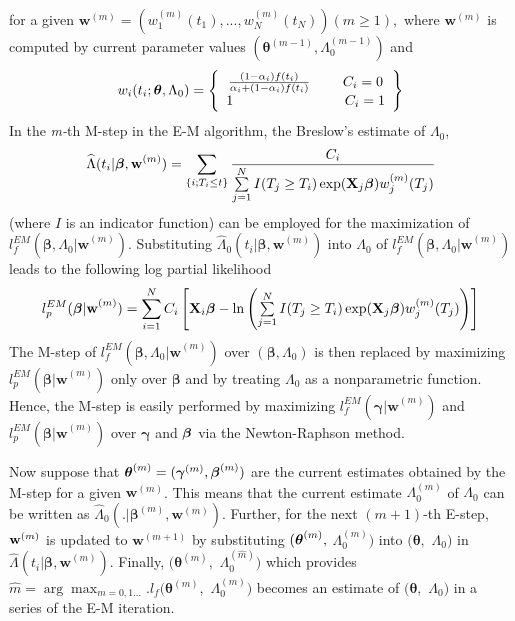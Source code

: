 \documentclass[a4paper, 12pt]{article}
\begin{document}
for a given $\mathbf{w}^{(m)}=(w_{1}^{(m)}(t_{1}),...,w_{N}^{(m)}(t_{N}))(m%
\geq 1),$ where $\mathbf{w}^{(m)}$ is computed by current parameter values $(%
\mathbf{\theta }^{(m-1)},\Lambda _{0}^{(m-1)})$ and%
\begin{equation}
w_{i}(t_{i};\mathbf{\theta },\Lambda _{0})=\left\{ 
\begin{array}{c}
\frac{(1-\alpha _{i})f(t_{i})}{\alpha _{i}+(1-\alpha _{i})f(t_{i})}\text{ \
\ \ \ }C_{i}=0 \\ 
1\text{ \ \ \ \ \ \ \ \ \ \ \ \ \ \ \ \ \ \ \ \ \ }C_{i}=1%
\end{array}%
\right\}
\end{equation}%
In the \textit{m-}th M-step in the E-M algorithm, the Breslow's estimate of $%
\Lambda _{0}$,%
\begin{equation}
\widehat{\Lambda }(t_{i}|\mathbf{\beta ,w}^{(m)})=\displaystyle %
\sum\limits_{\{i;T_{i}\leq t\}}\frac{C_{i}}{\tsum\limits_{j=1}^{N}I(T_{j}%
\geq T_{i})\exp (\mathbf{X}_{j}\mathbf{\beta })w_{j}^{(m)}(T_{j})}
\end{equation}%
(where $I$ is an indicator function) can be employed for the maximization of 
$l_{f}^{EM}(\mathbf{\beta ,}\Lambda _{0}\mathbf{|w}^{(m)})$. Substituting $%
\widehat{\Lambda }_{0}(t_{i}|\mathbf{\beta ,w}^{(m)})$ into $\Lambda _{0}$
of $l_{f}^{EM}(\mathbf{\beta ,}\Lambda _{0}\mathbf{|w}^{(m)})$ leads to the
following log partial likelihood%
\begin{equation}
l_{p}^{EM}(\mathbf{\beta |w}^{(m)})=\sum\limits_{i=1}^{N}C_{i}\left[ \mathbf{%
X}_{i}\mathbf{\beta }-\ln \left( \tsum\limits_{j=1}^{N}I(T_{j}\geq
T_{i})\exp (\mathbf{X}_{j}\mathbf{\beta })w_{j}^{(m)}(T_{j})\right) \right]
\end{equation}%
The M-step of $l_{f}^{EM}(\mathbf{\beta ,}\Lambda _{0}\mathbf{|w}^{(m)})$
over $(\mathbf{\beta ,}\Lambda _{0})$ is then replaced by maximizing $%
l_{p}^{EM}(\mathbf{\beta |w}^{(m)})$ only over $\mathbf{\beta }$ and by
treating $\Lambda _{0}$ as a nonparametric function. Hence, the M-step is
easily performed by maximizing $l_{f}^{EM}(\mathbf{\gamma |w}^{(m)})$ and $%
l_{p}^{EM}(\mathbf{\beta |w}^{(m)})$ over $\mathbf{\gamma }$ and $\mathbf{%
\beta }$ via the Newton-Raphson method.

Now suppose that $\mathbf{\theta }^{(m)}=(\mathbf{\gamma }^{(m)},\mathbf{%
\beta }^{(m)})$ are the current estimates obtained by the M-step for a given 
$\mathbf{w}^{(m)}$. This means that the current estimate $\Lambda _{0}^{(m)}$%
of $\Lambda _{0}$ can be written as $\widehat{\Lambda }_{0}(.|\mathbf{\beta }%
^{(m)}\mathbf{,w}^{(m)})$. Further, for the next $(m+1)$-th E-step, $\mathbf{%
w}^{(m)}$ is updated to $\mathbf{w}^{(m+1)}$ by substituting $(\mathbf{%
\theta }^{(m)},$ $\Lambda _{0}^{(m)})$ into $(\mathbf{\theta },$ $\Lambda
_{0})$ in $\widehat{\Lambda }(t_{i}|\mathbf{\beta ,w}^{(m)})$. Finally, $(%
\mathbf{\theta }^{(\widehat{m})},$ $\Lambda _{0}^{(\widehat{m})})$ which
provides $\widehat{m}=\arg \max_{m=0,1...}.l_{f}(\mathbf{\theta }^{(m)},$ $%
\Lambda _{0}^{(m)})$ becomes an estimate of $(\mathbf{\theta },$ $\Lambda
_{0})$ in a series of the E-M iteration.
\end{document}
